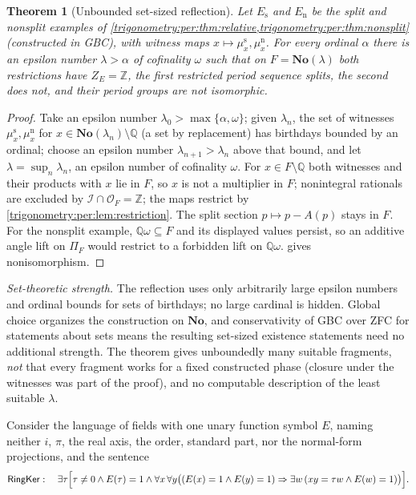 \documentclass[11pt,letterpaper]{article}
\numberwithin{equation}{section}
\newtheorem{theorem}{Theorem}[section]
\theoremstyle{definition}
\theoremstyle{remark}
\newcommand{\No}{\mathbf{No}}
\newcommand{\Q}{\mathbb Q}
\newcommand{\Z}{\mathbb Z}
\newcommand{\OO}{\mathcal O}
\newcommand{\cI}{\mathcal I}
\begin{document}
\begin{theorem}[Unbounded set-sized reflection]\label{trigonometry:per:thm:reflection}
Let $E_{\mathrm s}$ and $E_{\mathrm n}$ be the split and nonsplit examples of
\cref{trigonometry:per:thm:relative,trigonometry:per:thm:nonsplit} (constructed in GBC), with witness
maps $x\mapsto\mu^{\mathrm s}_x,\mu^{\mathrm n}_x$. For every ordinal $\alpha$ there is an epsilon
number $\lambda>\alpha$ of cofinality $\omega$ such that on $F=\No(\lambda)$ both restrictions have
$Z_E=\Z$, the first restricted period sequence splits, the second does not, and their period groups are
not isomorphic.
\end{theorem}
\begin{proof}
Take an epsilon number $\lambda_0>\max\{\alpha,\omega\}$; given $\lambda_n$, the set of witnesses
$\mu^{\mathrm s}_x,\mu^{\mathrm n}_x$ for $x\in\No(\lambda_n)\setminus\Q$ (a set by replacement) has
birthdays bounded by an ordinal; choose an epsilon number $\lambda_{n+1}>\lambda_n$ above that bound,
and let $\lambda=\sup_n\lambda_n$, an epsilon number of cofinality $\omega$. For $x\in F\setminus\Q$
both witnesses and their products with $x$ lie in $F$, so $x$ is not a multiplier in $F$; nonintegral
rationals are excluded by $\cI\cap\OO_F=\Z$; the maps restrict by
\cref{trigonometry:per:lem:restriction}. The split section $p\mapsto p-A(p)$ stays in $F$. For the
nonsplit example, $\Q\omega\subseteq F$ and its displayed values persist, so an additive angle lift on
$\Pi_F$ would restrict to a forbidden lift on $\Q\omega$.  gives
nonisomorphism.
\end{proof}
\emph{Set-theoretic strength.} The reflection uses only arbitrarily large epsilon numbers and ordinal
bounds for sets of birthdays; no large cardinal is hidden. Global choice organizes the construction on
$\No$, and conservativity of GBC over ZFC for statements about sets means the resulting set-sized
existence statements need no additional strength. The theorem gives unboundedly many suitable
fragments, \emph{not} that every fragment works for a fixed constructed phase (closure under the
witnesses was part of the proof), and no computable description of the least suitable $\lambda$.

Consider the language of fields with one unary function symbol $E$, naming neither $i$, $\pi$, the real
axis, the order, standard part, nor the normal-form projections, and the sentence
\begin{equation}\label{trigonometry:per:eq:ringker}
 \mathsf{RingKer}:\quad \exists\tau\Bigl[\tau\ne0\wedge E(\tau)=1\wedge\forall x\,\forall y\bigl(
 (E(x)=1\wedge E(y)=1)\Rightarrow\exists w\,(xy=\tau w\wedge E(w)=1)\bigr)\Bigr].
\end{equation}
\end{document}
